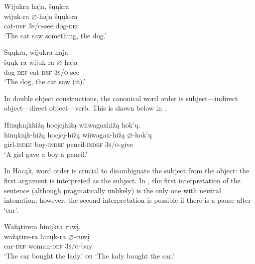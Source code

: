 \documentclass[output=paper]{LSP/langsci}
\begin{document}
\begin{exe}
\ex
\begin{xlist}

\ex \glll Wijukra  haja, šųųkra \\
 wijuk-ra {$\varnothing$}-haja  šųųk-ra\\
cat-\textsc{def}  \textsc{3s/o}-see dog-\textsc{def}\\
\glt `The cat saw something, the dog.' 

\ex \glll \v{S}ųųkra, wijukra haja  \\
 šųųk-ra wijuk-ra {$\varnothing$}-haja  \\
dog-\textsc{def} cat-\textsc{def}  \textsc{3s/o}-see \\
\glt `The dog, the cat saw (it).' 

\end{xlist}
\end{exe}

In double object constructions, the canonical word order is subject---indirect object---direct object---verb. This is shown below in .

\begin{exe}

\ex \glll Hinųknįkhižą hocįcįhižą wiiwagaxhižą hok'ų.\\
hinųknįk-hižą hocįcį-hižą wiiwagax-hižą {$\varnothing$}-hok'ų\\
girl-\textsc{indef} boy-\textsc{indef} pencil-\textsc{indef} \textsc{3s/o}-give\\
\glt `A girl gave a boy a pencil.'

\end{exe}

In Hocąk, word order is crucial to disambiguate the subject from the object: the first argument is interpreted as the subject. In , the first interpretation of the sentence (although pragmatically unlikely) is the only one with neutral intonation; however, the second interpretation is  possible if there is a pause after `car'.

\begin{exe}

\ex \glll Wažątirera hinųkra ruwį.\\
wažątire-ra hinųk-ra {$\varnothing$}-ruwį\\
car-\textsc{def} woman-\textsc{def} \textsc{3s/o}-buy\\
\glt `The car bought the lady.' \textsc{or} `The lady bought the car.'

\end{exe}
\end{document}
